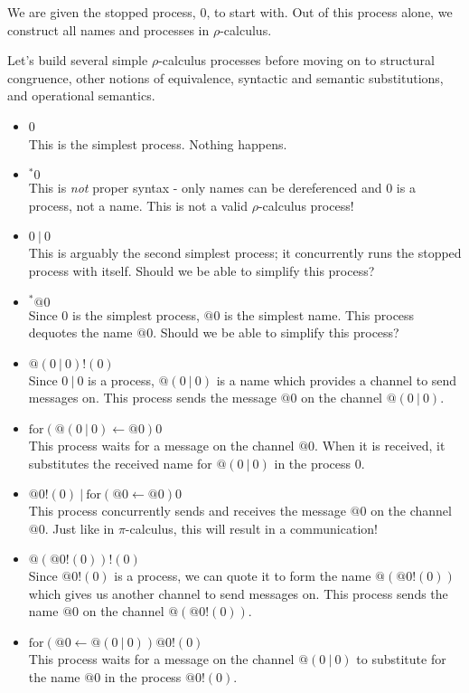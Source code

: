 \documentclass[12pt]{article}
\numberwithin{equation}{section}
\begin{document}
We are given the stopped process, $0$, to start with. Out of this process alone, we construct all names and processes in $\rho$-calculus.

Let's build several simple $\rho$-calculus processes before moving on to structural congruence, other notions of equivalence, syntactic and semantic substitutions, and operational semantics.
\begin{itemize}
\item 0 \\
This is the simplest process. Nothing happens.

\item ${}^*0$ \\
This is \emph{not} proper syntax - only names can be dereferenced and $0$ is a process, not a name. This is not a valid $\rho$-calculus process!

\item $0 \ | \ 0$ \\
This is arguably the second simplest process; it concurrently runs the stopped process with itself. Should we be able to simplify this  process?

\item ${}^*@0$ \\
Since $0$ is the simplest process, $@0$ is the simplest name. This process dequotes the name $@0$. Should we be able to simplify this  process?

\item $@(0 \ | \ 0)!(0)$ \\
Since $0 \ | \ 0$ is a process, $@(0 \ | \ 0)$ is a name which provides a channel to send messages on. This process sends the message $@0$ on the channel $@(0 \ | \ 0)$.

\item $\text{for}( @(0 \ | \ 0) \leftarrow @0)0$ \\
This process waits for a message on the channel $@0$. When it is received, it substitutes the received name for $@(0 \ | \ 0)$ in the process $0$.

\item $@0!(0) \ | \ \text{for}( @0 \leftarrow @0)0$ \\
This process concurrently sends and receives the message $@0$ on the channel $@0$. Just like in $\pi$-calculus, this will result in a communication!

\item $@(@0!(0))!(0)$ \\
Since $@0!(0)$ is a process, we can quote it to form the name $@(@0!(0))$ which gives us another channel to send messages on. This process sends the name $@0$ on the channel $@(@0!(0))$.

\item $\text{for}( @0 \leftarrow @(0 \ | \ 0))@0!(0)$ \\
This process waits for a message on the channel $@(0 \ | \ 0)$ to substitute for the name $@0$ in the process $@0!(0)$.
\end{itemize}
\end{document}
